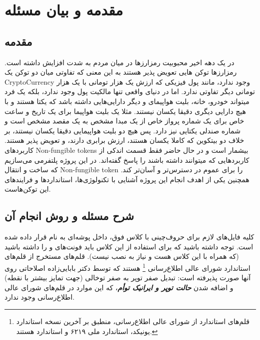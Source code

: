 
\chapter{مقدمه و بیان مسئله}

\section{مقدمه}
در یک دهه اخیر محبوبیت رمزارز‌ها در میان مردم به شدت افزایش داشته است. رمزارزها توکن هایی تعویض پذیر هستند به این معنی که تفاوتی میان دو توکن یک
\gls{CryptoCurrency}
وجود ندارد، مانند پول فیزیکی که ارزش یک هزار تومانی با یک هزار تومانی دیگر تفاوتی ندارد.
اما در دنیای واقعی تنها مالکیت پول وجود ندارد، بلکه یک فرد میتواند خودرو، خانه، بلیت هواپیمای و دیگر دارایی‌هایی داشته باشد که یکتا هستند و با هیچ دارایی دیگری دقیقا یکسان نیستند. مثلا یک بلیت هواپیما برای یک تاریخ و ساعت خاص برای یک شماره پرواز خاص از یک مبدا مشخص به یک مقصد مشخص است و شماره صندلی یکتایی نیز دارد. پس هیچ دو بلیت هواپیمایی دقیقا یکسان نیستند، بر خلاف دو بیتکوین که کاملا یکسان هستند، ارزش برابری دارند، و تعویض پذیر هستند.
کاربردهای
\glspl{Non-fungible token}
بیشمار است و در حال حاضر فقط قسمت اندکی از کاربردهایی که میتوانند داشته باشند را پاسخ گفته‌اند. در این پروژه پلتفرمی می‌سازیم که ساخت و انتقال
\gls{Non-fungible token}
را برای عموم در دسترس‌تر و آسان‌تر کند. همچنین یکی از اهدف انجام این پروژه آشنایی با تکنولوژی‌ها، استاندارد‌ها و فرایند‌های این توکن‌هاست.

\section{شرح مسئله و روش انجام آن}
کلیه فایل‌های لازم برای حروف‌چینی با کلاس فوق، داخل پوشه‌ای به نام
قرار داده شده است. توجه داشته باشید که برای استفاده از این کلاس باید فونت‌های
و
را داشته باشید (که همراه با این کلاس هست و نیاز به نصب نیست).
قلم‌های
مستخرج از قلم‌های استاندارد
شورای عالی اطلاع‌رسانی%
\footnote{
قلم‌های استاندارد
از شورای عالی اطلاع‌رسانی، منطبق بر آخرین نسخه استاندارد یونیکد، استاندارد ملی ۶۲۱۹ و استاندارد
هستند.
}
هستند که توسط دکتر بابایی‌زاده اصلاحاتی روی آنها صورت پذیرفته است: تبدیل صفر توپر به صفر توخالی (جهت تمایز بیشتر با نقطه) و اضافه شدن
\textit{\textbf{حالت توپر و ایرانیک توأم}}،
که این موارد در قلم‌های شورای عالی اطلاع‌رسانی وجود ندارد.

